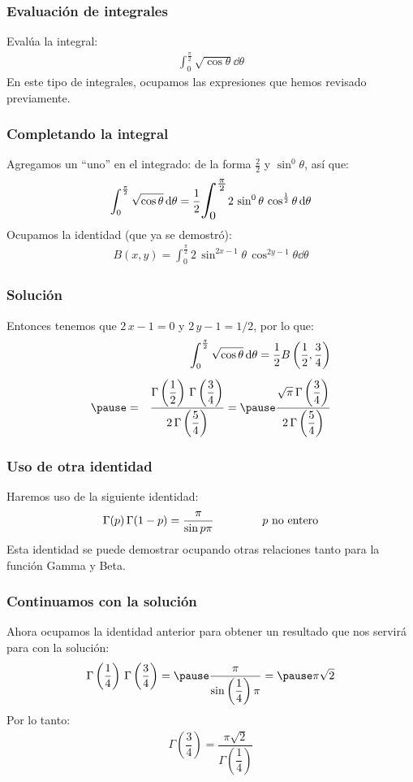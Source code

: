 \documentclass[12pt]{beamer}
\begin{document}
\begin{frame}
\frametitle{Evaluación de integrales}
Evalúa la integral:
\begin{align*}
\int_{0}^{\frac{\pi}{2}} \sqrt{\cos \theta} \dd{\theta}
\end{align*}
\pause
En este tipo de integrales, ocupamos las expresiones que hemos revisado previamente.
\end{frame}
\begin{frame}
\frametitle{Completando la integral}
Agregamos un \enquote{uno} en el integrado: de la forma $\frac{2}{2}$ y $\sin^{0} \theta$, así que:
\pause
\begin{eqnarray*}
\int_{0}^{\frac{\pi}{2}} \sqrt{\cos \theta} \dd{\theta} = \dfrac{1}{2} \scaleto{\int_{0}^{\frac{\pi}{2}}}{35pt} 2 \, \sin^{0} \theta \, \cos^{\frac{1}{2}} \theta \dd{\theta}
\end{eqnarray*}
\pause
Ocupamos la identidad (que ya se demostró):
\begin{align*}
B(x, y) = \int_{0}^{\frac{\pi}{2}} 2 \, \sin^{2x-1} \theta \, \cos^{2y-1} \theta \dd{\theta}
\end{align*}    
\end{frame}
\begin{frame}
\frametitle{Solución}
Entonces tenemos que $2 \, x - 1 = 0$ y $2 \, y - 1 = 1/2$, por lo que:
\pause
\begin{eqnarray}
&{}& \int_{0}^{\frac{\pi}{2}} \sqrt{\cos \theta} \dd{\theta} = \dfrac{1}{2} B\left( \dfrac{1}{2}, \dfrac{3}{4} \right) \nonumber \\[0.5em] \pause
&=& \dfrac{\Gamma \left( \dfrac{1}{2} \right) \, \Gamma \left( \dfrac{3}{4} \right)}{2 \, \Gamma \left( \dfrac{5}{4} \right)} = \pause \dfrac{\sqrt{\pi} \, \Gamma \left( \dfrac{3}{4} \right)}{2 \, \Gamma \left( \dfrac{5}{4} \right)} \label{eq:ecuacion_02_14_01}
\end{eqnarray}
\end{frame}
\begin{frame}
\frametitle{Uso de otra identidad}
Haremos uso de la siguiente identidad:
\begin{align*}
\Gamma (p) \, \Gamma(1 - p) = \dfrac{\pi}{\sin p \pi} \hspace{1.5cm} p \mbox{ no entero}
\end{align*}
\pause
Esta identidad se puede demostrar ocupando otras relaciones tanto para la función Gamma y Beta.
\end{frame}
\begin{frame}
\frametitle{Continuamos con la solución}
Ahora ocupamos la identidad anterior para obtener un resultado que nos servirá para con la solución:
\begin{eqnarray*}
\Gamma \left( \dfrac{1}{4} \right) \, \Gamma \left( \dfrac{3}{4} \right) = \pause \dfrac{\pi}{\sin \left( \dfrac{1}{4}\right) \pi} = \pause \pi \sqrt{2}
\end{eqnarray*}
\pause
Por lo tanto:
\begin{align*}
\Gamma \left( \dfrac{3}{4} \right) = \dfrac{\pi \sqrt{2}}{\Gamma \left(\dfrac{1}{4} \right)}
\end{align*}
\end{frame}
\end{document}
